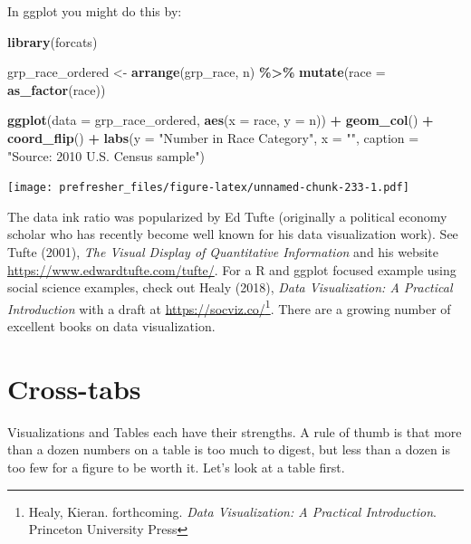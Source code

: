 \documentclass[
]{book}
\newenvironment{Shaded}{\begin{snugshade}}{\end{snugshade}}
\newcommand{\DataTypeTok}[1]{\textcolor[rgb]{0.13,0.29,0.53}{#1}}
\newcommand{\KeywordTok}[1]{\textcolor[rgb]{0.13,0.29,0.53}{\textbf{#1}}}
\newcommand{\NormalTok}[1]{#1}
\newcommand{\OperatorTok}[1]{\textcolor[rgb]{0.81,0.36,0.00}{\textbf{#1}}}
\newcommand{\StringTok}[1]{\textcolor[rgb]{0.31,0.60,0.02}{#1}}
\theoremstyle{definition}
\theoremstyle{definition}
\theoremstyle{definition}
\theoremstyle{remark}
\begin{document}
In ggplot you might do this by:

\begin{Shaded}
\begin{Highlighting}[]
\KeywordTok{library}\NormalTok{(forcats)}

\NormalTok{grp\_race\_ordered <{-}}\StringTok{ }\KeywordTok{arrange}\NormalTok{(grp\_race, n) }\OperatorTok{\%>\%}\StringTok{ }
\StringTok{  }\KeywordTok{mutate}\NormalTok{(}\DataTypeTok{race =} \KeywordTok{as\_factor}\NormalTok{(race))}

\KeywordTok{ggplot}\NormalTok{(}\DataTypeTok{data =}\NormalTok{ grp\_race\_ordered, }\KeywordTok{aes}\NormalTok{(}\DataTypeTok{x =}\NormalTok{ race, }\DataTypeTok{y =}\NormalTok{ n)) }\OperatorTok{+}
\StringTok{  }\KeywordTok{geom\_col}\NormalTok{() }\OperatorTok{+}
\StringTok{  }\KeywordTok{coord\_flip}\NormalTok{() }\OperatorTok{+}
\StringTok{  }\KeywordTok{labs}\NormalTok{(}\DataTypeTok{y =} \StringTok{"Number in Race Category"}\NormalTok{,}
       \DataTypeTok{x =} \StringTok{""}\NormalTok{,}
       \DataTypeTok{caption =} \StringTok{"Source: 2010 U.S. Census sample"}\NormalTok{)}
\end{Highlighting}
\end{Shaded}

\texttt{[image: prefresher\_files/figure-latex/unnamed-chunk-233-1.pdf]}

The data ink ratio was popularized by Ed Tufte (originally a political economy scholar who has recently become well known for his data visualization work). See Tufte (2001), \emph{The Visual Display of Quantitative Information} and his website \url{https://www.edwardtufte.com/tufte/}. For a R and ggplot focused example using social science examples, check out Healy (2018), \emph{Data Visualization: A Practical Introduction} with a draft at \url{https://socviz.co/}\footnote{Healy, Kieran. forthcoming. \emph{Data Visualization: A Practical Introduction}. Princeton University Press}. There are a growing number of excellent books on data visualization.

\hypertarget{cross-tabs}{%
\section{Cross-tabs}\label{cross-tabs}}

Visualizations and Tables each have their strengths. A rule of thumb is that more than a dozen numbers on a table is too much to digest, but less than a dozen is too few for a figure to be worth it. Let's look at a table first.
\end{document}
